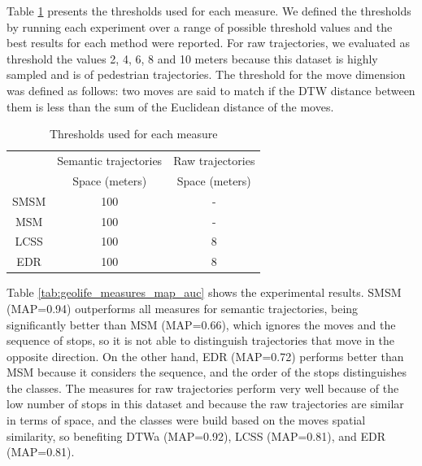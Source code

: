 Table \ref{tab:geolife_thresholds} presents the thresholds used for each measure. We defined the thresholds by running each experiment over a range of possible threshold values and the best results for each method were reported. For raw trajectories, we evaluated as threshold the  values 2, 4, 6, 8 and 10 meters because this dataset is highly sampled and is of pedestrian trajectories. The threshold for the move dimension was defined as follows: two moves are said to match if the DTW distance between them is less than the sum of the Euclidean distance of the moves.

\begin{table}[!h]
\scriptsize
  \centering
  \begin{tabular}{|c|c|c|}
  \hline
  & \multicolumn{1}{c|}{Semantic trajectories} & \multicolumn{1}{c|}{Raw trajectories} \\
 	\cline{2-3}
  & Space (meters) & Space (meters) \\
  \hline
 SMSM & 100 & - \\
 MSM & 100 & - \\
 LCSS & 100 & 8 \\
 EDR & 100 & 8 \\
    \hline
  \end{tabular}
  \caption{Thresholds used for each measure}
  \label{tab:geolife_thresholds}
\end{table}

Table \ref{tab:geolife_measures_map_auc} shows the experimental results.  {SMSM (MAP=0.94) outperforms all measures for semantic trajectories, being significantly better than MSM (MAP=0.66), which ignores the moves and the sequence of stops, so it is not able to distinguish trajectories that move in the opposite direction. On the other hand, EDR (MAP=0.72) performs better than MSM because it considers the sequence, and the order of the stops distinguishes the classes. The measures for raw trajectories perform very well because of the low number of stops in this dataset and because the raw trajectories are similar in terms of space, and the classes were build based on the moves spatial similarity, so benefiting DTWa (MAP=0.92), LCSS (MAP=0.81), and EDR (MAP=0.81). }


